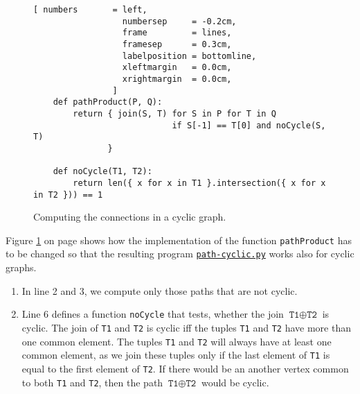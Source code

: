 \begin{figure}[!ht]
  \centering
\begin{Verbatim}[ numbers       = left,
                  numbersep     = -0.2cm,
                  frame         = lines, 
                  framesep      = 0.3cm, 
                  labelposition = bottomline,
                  xleftmargin   = 0.0cm,
                  xrightmargin  = 0.0cm,
                ]
    def pathProduct(P, Q):
        return { join(S, T) for S in P for T in Q
                            if S[-1] == T[0] and noCycle(S, T)
               }
    
    def noCycle(T1, T2):
        return len({ x for x in T1 }.intersection({ x for x in T2 })) == 1
\end{Verbatim} 
\vspace*{-0.3cm}
\caption{Computing the connections in a cyclic graph.}  
\label{fig:path-cyclic.py}
\end{figure} %

Figure \ref{fig:path-cyclic.py} on page shows how the implementation of the function
\texttt{pathProduct} has to be changed so that the resulting program
\href{https://github.com/karlstroetmann/Logic/blob/master/Python/path-cyclic.py}{\texttt{path-cyclic.py}}
works also for cyclic graphs. 
\begin{enumerate}
\item In line 2 and 3, we compute only those paths that are not cyclic.
\item Line 6 defines a function \texttt{noCycle} that tests, whether the join  $\texttt{T1} \oplus \texttt{T2}$ is cyclic.  The join
      of \texttt{T1} and \texttt{T2} is cyclic iff the tuples \texttt{T1} and \texttt{T2} have more
      than one common element.  The tuples \texttt{T1} and \texttt{T2} will always have at least one common element, as we join
      these tuples only if the last element of \texttt{T1} is equal to the first element of  \texttt{T2}.
      If there would be an another vertex common to both \texttt{T1} and \texttt{T2}, then the path
      $\texttt{T1} \oplus \texttt{T2}$ would be cyclic.
\end{enumerate}

